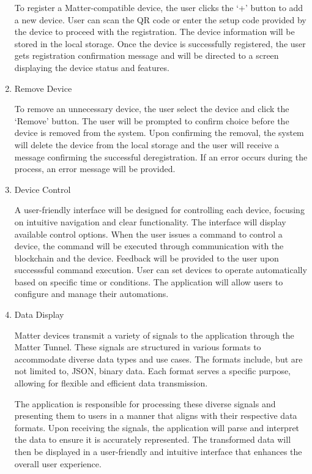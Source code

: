 \documentclass[conference]{IEEEtran}
\begin{document}
\begin{enumerate}[itemsep=2ex, parsep=1ex]
	      To register a Matter-compatible device, the user clicks the ‘+’ button to add
	      a new device. User can scan the QR code or enter the setup code provided
	      by the device to proceed with the registration. The device information will
	      be stored in the local storage. Once the device is successfully registered,
	      the user gets registration confirmation message and will be directed to a screen
	      displaying the device status and features.
	      	      
	\item Remove Device
	      	      
	      To remove an unnecessary device, the user select the device and click the ‘Remove’
	      button. The user will be prompted to confirm choice before the device is
	      removed from the system. Upon confirming the removal, the system will
	      delete the device from the local storage and the user will receive a
	      message confirming the successful deregistration. If an error occurs during
	      the process, an error message will be provided.
	      	      
	\item Device Control
	      	      
	      A user-friendly interface will be designed for controlling each device, focusing
	      on intuitive navigation and clear functionality. The interface will
	      display available control options. When the user issues a command to control
	      a device, the command will be executed through communication with the
	      blockchain and the device. Feedback will be provided to the user upon successsful
	      command execution. User can set devices to operate automatically based on
	      specific time or conditions. The application will allow users to configure
	      and manage their automations.
	      	      
	\item Data Display
	      	      
	      Matter devices transmit a variety of signals to the application through
	      the Matter Tunnel. These signals are structured in various formats to accommodate
	      diverse data types and use cases. The formats include, but are not limited
	      to, JSON, binary data. Each format serves a specific purpose, allowing for
	      flexible and efficient data transmission.
	      	      
	      The application is responsible for processing these diverse signals and presenting
	      them to users in a manner that aligns with their respective data formats.
	      Upon receiving the signals, the application will parse and interpret the data
	      to ensure it is accurately represented. The transformed data will then be
	      displayed in a user-friendly and intuitive interface that enhances the
	      overall user experience.
	      	      

\end{enumerate}
\end{document}
